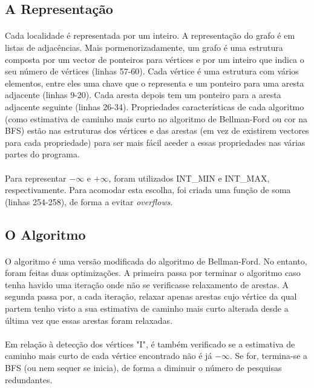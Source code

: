 \documentclass[12pt, a4paper]{article}
\begin{document}
\subsection{A Representação}
\paragraph{}
Cada localidade é representada por um inteiro. A representação do grafo é em
listas de adjacências. Mais pormenorizadamente, um grafo é uma estrutura
composta por um vector de ponteiros para vértices e por um inteiro que indica o
seu número de vértices (linhas 57-60). Cada vértice é uma estrutura com vários
elementos, entre eles uma chave que o representa e um ponteiro para uma aresta
adjacente (linhas 9-20). Cada aresta depois tem um ponteiro para a aresta
adjacente seguinte (linhas 26-34). Propriedades características de cada
algoritmo (como estimativa de caminho mais curto no algoritmo de Bellman-Ford ou
cor na BFS) estão nas estruturas dos vértices e das arestas (em vez de existirem
vectores para cada propriedade) para ser mais fácil aceder a essas propriedades
nas várias partes do programa.
\paragraph{}
Para representar $-\infty$ e $+\infty$, foram utilizados INT\_MIN e INT\_MAX,
respectivamente. Para acomodar esta escolha, foi criada uma função de soma
(linhas 254-258), de forma a evitar \textit{overflows}.

\subsection{O Algoritmo}
\paragraph{}
O algoritmo é uma versão modificada do algoritmo de Bellman-Ford. No entanto,
foram feitas duas optimizações. A primeira passa por terminar o algoritmo caso
tenha havido uma iteração onde não se verificasse relaxamento de arestas. A
segunda passa por, a cada iteração, relaxar apenas arestas cujo vértice da qual
partem tenho visto a sua estimativa de caminho mais curto alterada desde a
última vez que essas arestas foram relaxadas.
\paragraph{}
Em relação à detecção dos vértices "I", é também verificado se a estimativa de
caminho mais curto de cada vértice encontrado não é já $-\infty$.  Se for,
termina-se a BFS (ou nem sequer se inicia), de forma a diminuir o número de
pesquisas redundantes.
\end{document}
